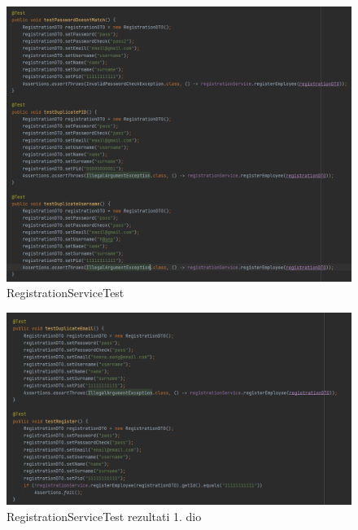 				\begin{figure}[H] 					\centering 				\includegraphics[width=\textwidth]{Dokumentacija/ispit-komp/RegistrationServiceTest - 1. dio.png}
				\caption{RegistrationServiceTest}
				\end{figure}
                \begin{figure}[H] 					\centering 					                    \includegraphics[width=\textwidth]{Dokumentacija/ispit-komp/RegistrationServiceTest - 2. dio.png}
				\caption{RegistrationServiceTest rezultati 1. dio}
				\end{figure}
